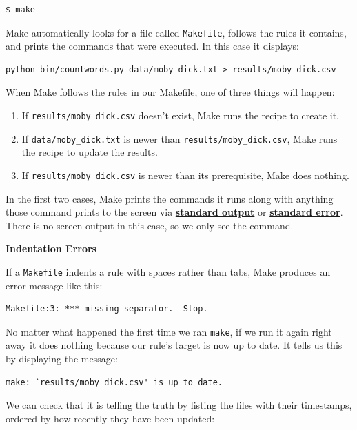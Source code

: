 \documentclass[
]{krantz}
\providecommand{\tightlist}{%
  \setlength{\itemsep}{0pt}\setlength{\parskip}{0pt}}
\renewenvironment{quote}{\begin{VF}}{\end{VF}}
\newcommand{\gref}[2]{\hyperlink{#2}{\textbf{#1}}}
\begin{document}
\begin{verbatim}
$ make
\end{verbatim}

Make automatically looks for a file called \texttt{Makefile},
follows the rules it contains,
and prints the commands that were executed.
In this case it displays:

\begin{verbatim}
python bin/countwords.py data/moby_dick.txt > results/moby_dick.csv
\end{verbatim}

When Make follows the rules in our Makefile,
one of three things will happen:

\begin{enumerate}
\def\labelenumi{\arabic{enumi}.}
\tightlist
\item
  If \texttt{results/moby\_dick.csv} doesn't exist,
  Make runs the recipe to create it.
\item
  If \texttt{data/moby\_dick.txt} is newer than \texttt{results/moby\_dick.csv},
  Make runs the recipe to update the results.
\item
  If \texttt{results/moby\_dick.csv} is newer than its prerequisite,
  Make does nothing.
\end{enumerate}

In the first two cases,
Make prints the commands it runs
along with anything those command prints to the screen
via \gref{standard output}{stdout} or \gref{standard error}{stderr}.
There is no screen output in this case,
so we only see the command.

\begin{quote}
\textbf{Indentation Errors}

If a \texttt{Makefile} indents a rule with spaces rather than tabs,
Make produces an error message like this:

\begin{verbatim}
Makefile:3: *** missing separator.  Stop.
\end{verbatim}
\end{quote}

No matter what happened the first time we ran \texttt{make},
if we run it again right away it does nothing
because our rule's target is now up to date.
It tells us this by displaying the message:

\begin{verbatim}
make: `results/moby_dick.csv' is up to date.
\end{verbatim}

We can check that it is telling the truth by listing the files with their timestamps,
ordered by how recently they have been updated:
\end{document}
